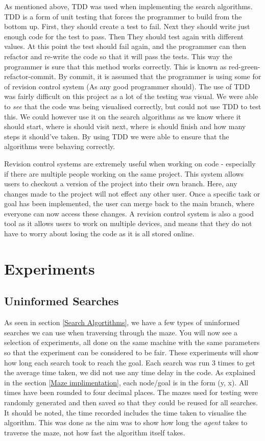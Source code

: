 \documentclass[]{final_report}
\renewcommand{\arraystretch}{2}
\begin{document}
As mentioned above, TDD was used when implementing the search algorithms. TDD is a form of unit testing that forces the programmer to build from the bottom up. First, they should create a test to fail. Next they should write just enough code for the test to pass. Then They should test again with different values. At this point the test should fail again, and the programmer can then refactor and re-write the code so that it will pass the tests. This way the programmer is sure that this method works correctly. This is known as red-green-refactor-commit. By commit, it is assumed that the programmer is using some for of revision control system (As any good programmer should). The use of TDD was fairly difficult on this project as a lot of the testing was visual. We were able to \textit{see} that the code was being visualised correctly, but could not use TDD to test this. We could however use it on the search algorithms as we know where it should start, where is should visit next, where is should finish and how many steps it should've taken. By using TDD we were able to ensure that the algorithms were behaving correctly. 

Revision control systems are extremely useful when working on code - especially if there are multiple people working on the same project. This system allows users to checkout a version of the project into their own branch. Here, any changes made to the project will not effect any other user. Once a specific task or goal has been implemented, the user can merge back to the main branch, where everyone can now access these changes. A revision control system is also a good tool as it allows users to work on multiple devices, and means that they do not have to worry about losing the code as it is all stored online. 



\chapter{Experiments}
\renewcommand{\arraystretch}{1}
\section{Uninformed Searches}\label{unininformed search implimentation}

As seen in section \ref{Search Algortithms}, we have a few types of uninformed searches we can use when traversing through the maze. You will now see a selection of experiments, all done on the same machine with the same parameters so that the experiment can be considered to be fair. These experiments will show how long each search took to reach the goal. Each search was run 3 times to get the average time taken, we did not use any time delay in the code. As explained in the section \ref{Maze implimentation}, each node/goal is in the form (y, x). All times have been rounded to four decimal places. The mazes used for testing were randomly generated and then saved so that they could be reused for all searches. It should be noted, the time recorded includes the time taken to visualise the algorithm. This was done as the aim was to show how long the \textit{agent} takes to traverse the maze, not how fast the algorithm itself takes.
\end{document}
